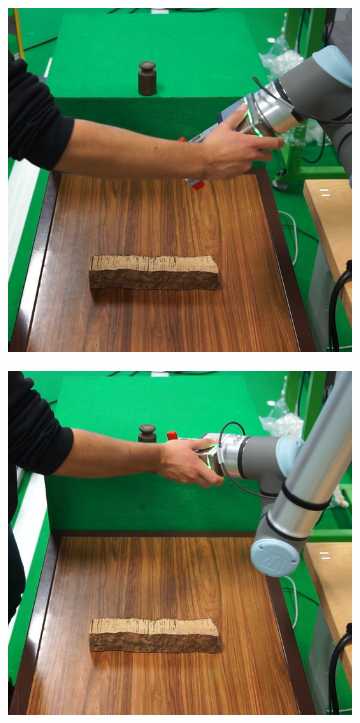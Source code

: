 \begin{figure}[h]
    \centering
    \begin{subfigure}{.2\linewidth}
        \centering
        \includegraphics[width=.95\linewidth]{figs/chp6/om_test_0.jpg}
    \end{subfigure}%
    \begin{subfigure}{.2\linewidth}
        \centering
        \includegraphics[width=.95\linewidth]{figs/chp6/om_test_1.jpg}

\end{subfigure}
\end{figure}
